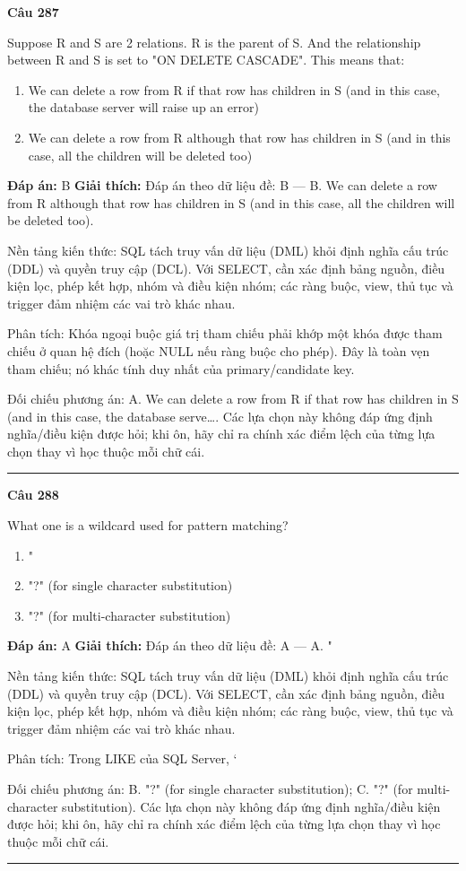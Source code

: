 \documentclass[11pt,a4paper]{article}
\newenvironment{question}[1]{%
  \par\vspace{1em}\noindent\textbf{\large Câu #1}\par\vspace{0.4em}
}{%
  \par\vspace{1em}\hrule\vspace{0.6em}
}
\newenvironment{choices}{%
  \begin{enumerate}[label=\textbf{\Alph*.},leftmargin=2.2em,itemsep=2pt,topsep=3pt]
}{%
  \end{enumerate}
}
\newcommand{\choice}{\item}
\begin{document}
\begin{question}{287}
Suppose R and S are 2 relations. R is the parent of S.
And the relationship between R and S is set to
"ON DELETE CASCADE".
This means that:
\begin{choices}
\choice We can delete a row from R if that row has children in S (and in this case, the database server will raise up an error)
\choice We can delete a row from R although that row has children in S (and in this case, all the children will be deleted too)
\end{choices}
\textbf{Đáp án:} B
\textbf{Giải thích:} Đáp án theo dữ liệu đề: B — B. We can delete a row from R although that row has children in S (and in this case, all the children will be deleted too).

Nền tảng kiến thức: SQL tách truy vấn dữ liệu (DML) khỏi định nghĩa cấu trúc (DDL) và quyền truy cập (DCL). Với SELECT, cần xác định bảng nguồn, điều kiện lọc, phép kết hợp, nhóm và điều kiện nhóm; các ràng buộc, view, thủ tục và trigger đảm nhiệm các vai trò khác nhau.

Phân tích: Khóa ngoại buộc giá trị tham chiếu phải khớp một khóa được tham chiếu ở quan hệ đích (hoặc NULL nếu ràng buộc cho phép). Đây là toàn vẹn tham chiếu; nó khác tính duy nhất của primary/candidate key.

Đối chiếu phương án: A. We can delete a row from R if that row has children in S (and in this case, the database serve…. Các lựa chọn này không đáp ứng định nghĩa/điều kiện được hỏi; khi ôn, hãy chỉ ra chính xác điểm lệch của từng lựa chọn thay vì học thuộc mỗi chữ cái.
\end{question}

\begin{question}{288}
What one is a wildcard used for pattern matching?
\begin{choices}
\choice "%
\choice "?" (for single character substitution)
\choice "?" (for multi-character substitution)
\end{choices}
\textbf{Đáp án:} A
\textbf{Giải thích:} Đáp án theo dữ liệu đề: A — A. "%

Nền tảng kiến thức: SQL tách truy vấn dữ liệu (DML) khỏi định nghĩa cấu trúc (DDL) và quyền truy cập (DCL). Với SELECT, cần xác định bảng nguồn, điều kiện lọc, phép kết hợp, nhóm và điều kiện nhóm; các ràng buộc, view, thủ tục và trigger đảm nhiệm các vai trò khác nhau.

Phân tích: Trong LIKE của SQL Server, `%

Đối chiếu phương án: B. "?" (for single character substitution); C. "?" (for multi-character substitution). Các lựa chọn này không đáp ứng định nghĩa/điều kiện được hỏi; khi ôn, hãy chỉ ra chính xác điểm lệch của từng lựa chọn thay vì học thuộc mỗi chữ cái.
\end{question}
\end{document}
